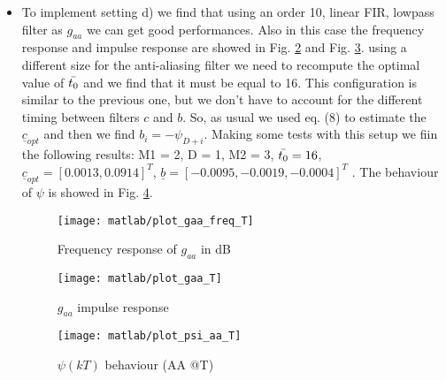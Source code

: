 \documentclass[a4paper,oneside]{article}
\renewcommand{\vec}[1]{\underline{#1}}
\begin{document}
\begin{itemize}
\begin{figure}[H]
  \centering
  \texttt{[image: matlab/plot\_psi\_aa]}
  \caption{$\psi(kT)$ behaviour (AA @T/2) (C @T/2)}
  \label{plot:psi_aa}
\end{figure}
Proceeding like in the previous points we inspected the impulse response before the sampler $q_r(n T/4) = (q_c * g_m)(n T/4)$ and we find that, to sample in the peak, we must choose $\Bar{t_0} = 20$, but in this case we sample every T/2. The design of the optimum filter $c$ it's done as in case b), with the through the equation (8), then we downsample the received signal by a factor $F_0 = 2$ to return at time T. Finally to build the $b$ filter we used the relation $b_i = - \psi_{2(D+i}$ {\color{red}that takes into account the fact that the filter $c$ works at T/2 but after the downsampler we have a simbol (and a postcursus of psi that needs to be cancelled) every T seconds}. In our tries we find the following settings as the best: M1 = 3, M2 = 2, D = 1, $\Bar{t_0} = 20$ and we obtained: $\vec{c}_{opt} = [0.0012, 0.0451, 0.2879]^T$ $\vec{b} = [-0.0518, -0.0086]^T$. The correspondent $\psi$ at time T is showed in Fig. \ref{plot:psi_aa}.
\newpage
\item
To implement setting d) we find that using an order 10, linear FIR, lowpass filter as $g_{aa}$ we can get good performances. Also in this case the frequency response and impulse response are showed in Fig. \ref{plot:gaa_freq_T} and Fig. \ref{plot:gaa}. using a different size for the anti-aliasing filter we need to recompute the optimal value of $\Bar{t_0}$ and we find that it must be equal to 16. This configuration is similar to the previous one, but we don't have to account for the different timing between filters $c$ and $b$. So, as usual we used eq. (8) to estimate the $\vec{c}_{opt}$ and then we find $b_i = -\psi_{D+i}$. Making some tests with this setup we fiin the following results: M1 = 2, D = 1, M2 = 3, $\Bar{t_0} = 16$, $\vec{c}_{opt} = [0.0013, 0.0914]^T$, $\vec{b} = [-0.0095, -0.0019, -0.0004]^T$ . The behaviour of $\psi$ is showed in Fig. \ref{plot:gaa_psi_T}.
\begin{figure}[h]
  \centering
  \texttt{[image: matlab/plot\_gaa\_freq\_T]}
  \caption{Frequency response of $g_{aa}$ in dB}
  \label{plot:gaa_freq_T}
\end{figure}

\begin{figure}[h]
  \centering
  \texttt{[image: matlab/plot\_gaa\_T]}
  \caption{$g_{aa}$ impulse response}
  \label{plot:gaa}
\end{figure}

\begin{figure}[h]
  \centering
  \texttt{[image: matlab/plot\_psi\_aa\_T]}
  \caption{$\psi(kT)$ behaviour (AA @T)}
  \label{plot:gaa_psi_T}
\end{figure}

\end{itemize}
\end{document}
